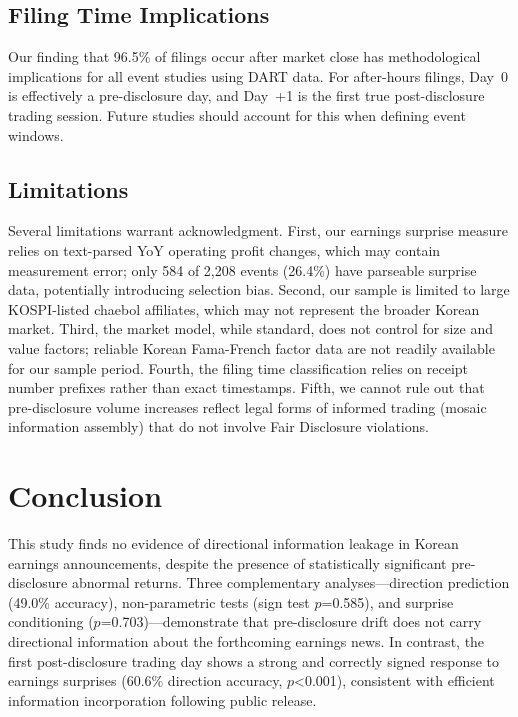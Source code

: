 \documentclass[review,authoryear]{elsarticle}
\begin{document}
\subsection{Filing Time Implications}

Our finding that 96.5\% of filings occur after market close has methodological implications for all event studies using DART data. For after-hours filings, Day~0 is effectively a pre-disclosure day, and Day~+1 is the first true post-disclosure trading session. Future studies should account for this when defining event windows.

\subsection{Limitations}

Several limitations warrant acknowledgment. First, our earnings surprise measure relies on text-parsed YoY operating profit changes, which may contain measurement error; only 584 of 2,208 events (26.4\%) have parseable surprise data, potentially introducing selection bias. Second, our sample is limited to large KOSPI-listed chaebol affiliates, which may not represent the broader Korean market. Third, the market model, while standard, does not control for size and value factors; reliable Korean Fama-French factor data are not readily available for our sample period. Fourth, the filing time classification relies on receipt number prefixes rather than exact timestamps. Fifth, we cannot rule out that pre-disclosure volume increases reflect legal forms of informed trading (mosaic information assembly) that do not involve Fair Disclosure violations.

\section{Conclusion}
\label{sec:conclusion}

This study finds no evidence of directional information leakage in Korean earnings announcements, despite the presence of statistically significant pre-disclosure abnormal returns. Three complementary analyses---direction prediction (49.0\% accuracy), non-parametric tests (sign test $p$=0.585), and surprise conditioning ($p$=0.703)---demonstrate that pre-disclosure drift does not carry directional information about the forthcoming earnings news. In contrast, the first post-disclosure trading day shows a strong and correctly signed response to earnings surprises (60.6\% direction accuracy, $p$<0.001), consistent with efficient information incorporation following public release.
\end{document}
